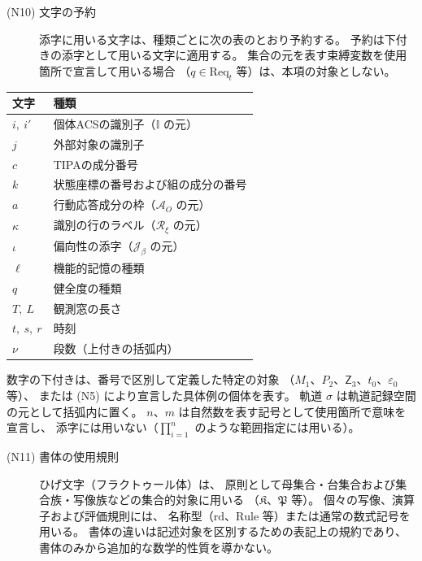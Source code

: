 \begin{description}
  \item[(N10) 文字の予約]
    添字に用いる文字は、種類ごとに次の表のとおり予約する。
    予約は下付きの添字として用いる文字に適用する。
    集合の元を表す束縛変数を使用箇所で宣言して用いる場合
    （$q\in\mathrm{Req}_t$ 等）は、本項の対象としない。

\end{description}

\begin{center}
\begin{tabular}{ll}
  \hline
  文字 & 種類 \\
  \hline
  $i,\ i'$ & 個体ACSの識別子（$\mathbb I$ の元） \\
  $j$ & 外部対象の識別子 \\
  $c$ & TIPAの成分番号 \\
  $k$ & 状態座標の番号および組の成分の番号 \\
  $a$ & 行動応答成分の枠（$\mathcal A_O$ の元） \\
  $\kappa$ & 識別の行のラベル（$\mathcal R_\xi$ の元） \\
  $\iota$ & 偏向性の添字（$\mathcal J_\beta$ の元） \\
  $\ell$ & 機能的記憶の種類 \\
  $q$ & 健全度の種類 \\
  $T,\ L$ & 観測窓の長さ \\
  $t,\ s,\ r$ & 時刻 \\
  $\nu$ & 段数（上付きの括弧内） \\
  \hline
\end{tabular}
\end{center}

数字の下付きは、番号で区別して定義した特定の対象
（$M_1$、$P_2$、$\mathsf Z_3$、$t_0$、$\varepsilon_0$ 等）、
または (N5) により宣言した具体例の個体を表す。
軌道 $\sigma$ は軌道記録空間の元として括弧内に置く。
$n$、$m$ は自然数を表す記号として使用箇所で意味を宣言し、
添字には用いない（$\prod_{i=1}^{n}$ のような範囲指定には用いる）。

\begin{description}
  \item[(N11) 書体の使用規則]
    ひげ文字（フラクトゥール体）は、
    原則として母集合・台集合および集合族・写像族などの集合的対象に用いる
    （$\mathfrak K$、$\mathfrak P$ 等）。
    個々の写像、演算子および評価規則には、
    名称型（$\mathrm{rd}$、$\mathrm{Rule}$ 等）または通常の数式記号を用いる。
    書体の違いは記述対象を区別するための表記上の規約であり、
    書体のみから追加的な数学的性質を導かない。
\end{description}
